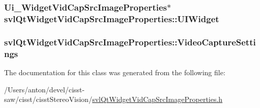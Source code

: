 \subsubsection[{U\+I\+Widget}]{\setlength{\rightskip}{0pt plus 5cm}Ui\+\_\+\+Widget\+Vid\+Cap\+Src\+Image\+Properties$\ast$ svl\+Qt\+Widget\+Vid\+Cap\+Src\+Image\+Properties\+::\+U\+I\+Widget\hspace{0.3cm}{\ttfamily [protected]}}\label{classsvl_qt_widget_vid_cap_src_image_properties_ac38817abd20ff403980a47cf9c237b48}
\hypertarget{classsvl_qt_widget_vid_cap_src_image_properties_afbb8469c066f6acc9cc475f32cca47e6}{}
\subsubsection[{Video\+Capture\+Settings}]{ svl\+Qt\+Widget\+Vid\+Cap\+Src\+Image\+Properties\+::\+Video\+Capture\+Settings}\label{classsvl_qt_widget_vid_cap_src_image_properties_afbb8469c066f6acc9cc475f32cca47e6}


The documentation for this class was generated from the following file\+:\begin{DoxyCompactItemize}
\item 
/\+Users/anton/devel/cisst-\/saw/cisst/cisst\+Stereo\+Vision/\hyperlink{svl_qt_widget_vid_cap_src_image_properties_8h}{svl\+Qt\+Widget\+Vid\+Cap\+Src\+Image\+Properties.\+h}\end{DoxyCompactItemize}
